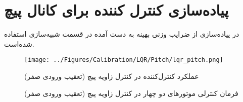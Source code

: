 \section{پیاده‌سازی کنترل کننده برای کانال پیچ}\label{roll_lqr_section}
در پیاده‌سازی از ضرایب وزنی بهینه به دست آمده در قسمت شبیه‌سازی استفاده شده‌است.
\begin{figure}[H]
	\texttt{[image: ../Figures/Calibration/LQR/Pitch/lqr\_pitch.png]}
	\centering
	\caption{عملكرد کنترل‌کننده  در کنترل زاويه پیچ (تعقیب ورودی صفر)}
\end{figure}
%
\begin{figure}[H]
	\centering
	\caption{‫‪فرمان کنترلی موتورهای دو چهار در کنترل زاویه پیچ (تعقیب ورودی صفر)}
\end{figure}
